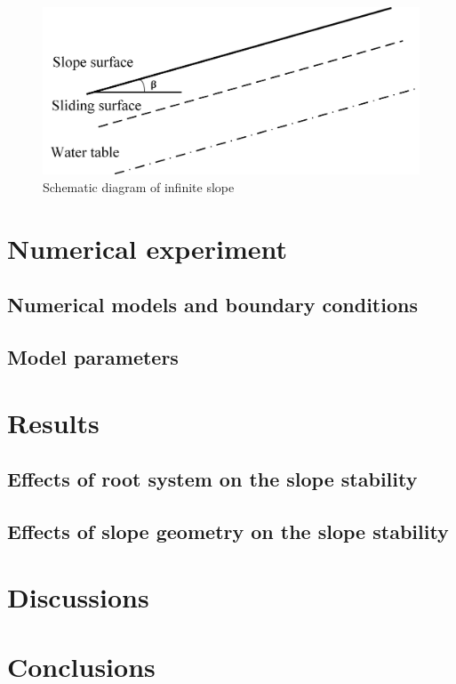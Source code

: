 \begin{figure}
\includegraphics[width=1.0\textwidth]{slopemodel.jpg}
\caption{Schematic diagram of infinite slope}
\end{figure} 
\label{fig:sm}

\section{Numerical experiment}

\subsection{Numerical models and boundary conditions}

\subsection{Model parameters}

\section{Results}

\subsection{Effects of root system on the slope stability}


\subsection{Effects of slope geometry on the slope stability}


\section{Discussions}


\section{Conclusions}



